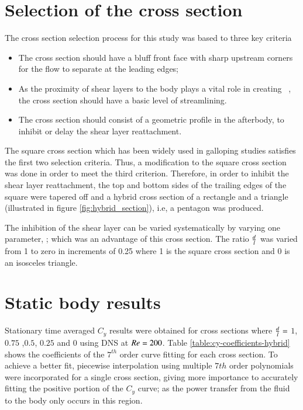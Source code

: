\section{Selection of the cross section}

The cross section selection process for this study was based to three key criteria 

\begin{itemize}
	\item The cross section should have a bluff front face with sharp upstream corners for the flow to separate at the leading edges;
	
	\item As the proximity of shear layers to the body plays a vital role in creating \cy \ \citep{Parkinson1989}, the cross section should have a basic level of streamlining.
	
	\item The cross section should consist of a geometric profile in the afterbody, to inhibit or delay the shear layer reattachment.   
\end{itemize}


The square cross section which has been widely used in galloping studies satisfies the first two selection criteria. Thus, a modification to the square cross section was done in order to meet the third criterion. Therefore, in order to inhibit the shear layer reattachment, the top and bottom sides of the trailing edges of the square were tapered off and a hybrid cross section of a rectangle and a triangle (illustrated in figure \ref{fig:hybrid_section}), i.e, a pentagon was produced.



The inhibition of the shear layer can be varied systematically by varying one parameter, \ratio; which was an advantage of this cross section. The ratio $\frac{d}{l}$ was varied from 1 to zero in increments of 0.25 where 1 is the square cross section and 0 is an isosceles triangle. 


\section{Static body results}




Stationary time averaged $C_y$ results were obtained for cross sections where $\frac{d}{l}=$ $1$, $0.75$ ,$0.5$, $0.25$ and $0$ using DNS at $Re=200$. Table \ref{table:cy-coefficients-hybrid} shows the coefficients of the $7^{th}$ order curve fitting for each cross section. To achieve a better fit, piecewise interpolation using multiple $7th$ order polynomials were incorporated for a single cross section, giving more importance to accurately fitting the positive portion of the $C_{y}$ curve; as the power transfer from the fluid to the body only occurs in this region.

